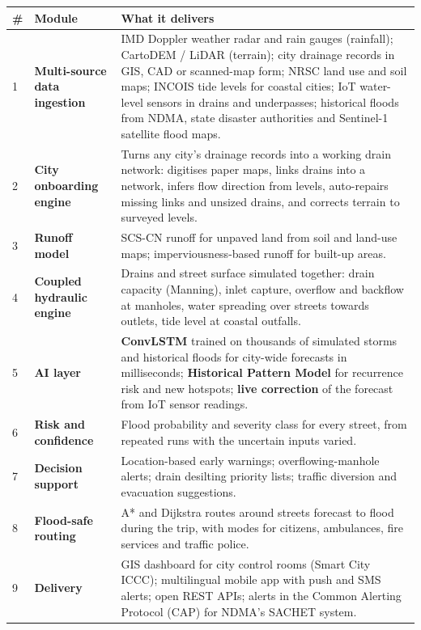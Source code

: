 \documentclass[11pt,a4paper]{article}
\begin{document}
{\small
\begin{longtable}{@{}p{0.6cm}p{3.6cm}p{11.8cm}@{}}
\toprule
\textbf{\#} & \textbf{Module} & \textbf{What it delivers}\\
\midrule\endhead
1 & \textbf{Multi-source data ingestion} &
  IMD Doppler weather radar and rain gauges (rainfall); CartoDEM / LiDAR (terrain);
  city drainage records in GIS, CAD or scanned-map form; NRSC land use and soil maps;
  INCOIS tide levels for coastal cities; IoT water-level sensors in drains and
  underpasses; historical floods from NDMA, state disaster authorities and Sentinel-1
  satellite flood maps.\\
2 & \textbf{City onboarding engine} &
  Turns any city's drainage records into a working drain network: digitises paper maps,
  links drains into a network, infers flow direction from levels, auto-repairs missing
  links and unsized drains, and corrects terrain to surveyed levels.\\
3 & \textbf{Runoff model} &
  SCS-CN runoff for unpaved land from soil and land-use maps; imperviousness-based runoff
  for built-up areas.\\
4 & \textbf{Coupled hydraulic engine} &
  Drains and street surface simulated together: drain capacity (Manning), inlet capture,
  overflow and backflow at manholes, water spreading over streets towards outlets, tide
  level at coastal outfalls.\\
5 & \textbf{AI layer} &
  \textbf{ConvLSTM} trained on thousands of simulated storms and historical floods for
  city-wide forecasts in milliseconds; \textbf{Historical Pattern Model} for recurrence
  risk and new hotspots; \textbf{live correction} of the forecast from IoT sensor
  readings.\\
6 & \textbf{Risk and confidence} &
  Flood probability and severity class for every street, from repeated runs with the
  uncertain inputs varied.\\
7 & \textbf{Decision support} &
  Location-based early warnings; overflowing-manhole alerts; drain desilting priority
  lists; traffic diversion and evacuation suggestions.\\
8 & \textbf{Flood-safe routing} &
  A* and Dijkstra routes around streets forecast to flood during the trip, with modes
  for citizens, ambulances, fire services and traffic police.\\
9 & \textbf{Delivery} &
  GIS dashboard for city control rooms (Smart City ICCC); multilingual mobile app with
  push and SMS alerts; open REST APIs; alerts in the Common Alerting Protocol (CAP) for
  NDMA's SACHET system.\\
\bottomrule
\end{longtable}}
\end{document}
